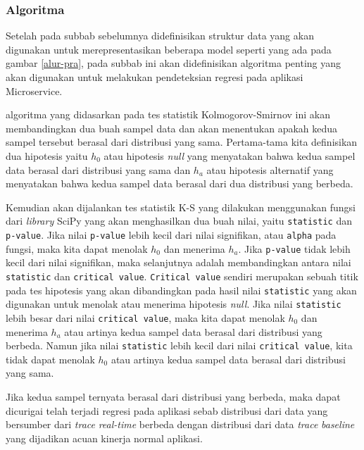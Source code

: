 \subsubsection{Algoritma}
Setelah pada subbab sebelumnya didefinisikan struktur data yang akan digunakan untuk merepresentasikan beberapa model seperti yang ada pada gambar \ref{alur-pra}, pada subbab ini akan didefinisikan algoritma penting yang akan digunakan untuk melakukan pendeteksian regresi pada aplikasi Microservice. 

algoritma yang didasarkan pada tes statistik Kolmogorov-Smirnov ini akan membandingkan dua buah sampel data dan akan menentukan apakah kedua sampel tersebut berasal dari distribusi yang sama. Pertama-tama kita definisikan dua hipotesis yaitu $h_{0}$ atau hipotesis \textit{null} yang menyatakan bahwa kedua sampel data berasal dari distribusi yang sama dan $h_{a}$ atau hipotesis alternatif yang menyatakan bahwa kedua sampel data berasal dari dua distribusi yang berbeda. 

Kemudian akan dijalankan tes statistik K-S yang dilakukan menggunakan fungsi dari \textit{library}
SciPy yang akan menghasilkan dua buah nilai, yaitu \texttt{statistic} dan \texttt{p-value}. Jika nilai \texttt{p-value} lebih kecil dari nilai signifikan, atau \texttt{alpha} pada fungsi,  maka kita dapat menolak $h_{0}$ dan menerima $h_{a}$. Jika  \texttt{p-value} tidak lebih kecil dari nilai signifikan, maka selanjutnya adalah membandingkan antara nilai \texttt{statistic} dan \texttt{critical value}. \texttt{Critical value} sendiri merupakan sebuah titik pada tes hipotesis yang akan dibandingkan pada hasil nilai \texttt{statistic} yang akan digunakan untuk menolak atau menerima hipotesis \textit{null}. Jika nilai \texttt{statistic} lebih besar dari nilai \texttt{critical value}, maka kita dapat menolak $h_{0}$ dan menerima $h_{a}$ atau artinya kedua sampel data berasal dari distribusi yang berbeda. Namun jika  nilai \texttt{statistic} lebih kecil dari nilai \texttt{critical value}, kita tidak dapat menolak $h_{0}$ atau artinya kedua sampel data berasal dari distribusi yang sama.


Jika kedua sampel ternyata berasal dari distribusi yang berbeda, maka dapat dicurigai telah terjadi regresi pada aplikasi sebab distribusi dari data yang bersumber dari  \textit{trace} \textit{real-time} berbeda dengan distribusi dari data \textit{trace} \textit{baseline} yang dijadikan acuan kinerja normal aplikasi.





